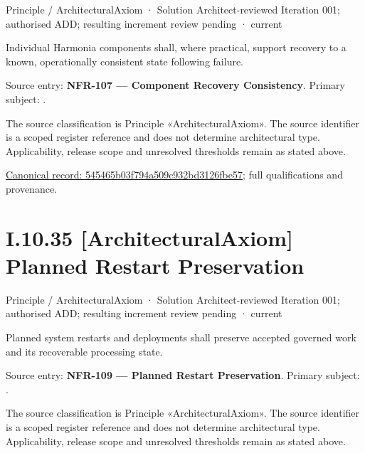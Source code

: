 \label{element:545465b03f794a509c932bd3126fbe57}
{\small Principle / ArchitecturalAxiom · Solution Architect-reviewed Iteration 001; authorised ADD; resulting increment review pending · current}\par

Individual Harmonia components shall, where practical, support recovery to a known, operationally consistent state following failure.



Source entry: \textbf{NFR-107 — Component Recovery Consistency}. Primary subject: \texttt{}.



The source classification is Principle «ArchitecturalAxiom». The source identifier is a scoped register reference and does not determine architectural type. Applicability, release scope and unresolved thresholds remain as stated above.


{\footnotesize \href{../../../../../../../continuum/motivation/principle/architectural-axiom/545465b03f794a509c932bd3126fbe57.md}{Canonical record: 545465b03f794a509c932bd3126fbe57}; full qualifications and provenance.}\par
\section*{I.10.35 [ArchitecturalAxiom] Planned Restart Preservation}
\label{navigation:I.10.35}

\label{element:0ce24ee595a445e5b1a95e54aa9f1eac}
{\small Principle / ArchitecturalAxiom · Solution Architect-reviewed Iteration 001; authorised ADD; resulting increment review pending · current}\par

Planned system restarts and deployments shall preserve accepted governed work and its recoverable processing state.



Source entry: \textbf{NFR-109 — Planned Restart Preservation}. Primary subject: \texttt{}.



The source classification is Principle «ArchitecturalAxiom». The source identifier is a scoped register reference and does not determine architectural type. Applicability, release scope and unresolved thresholds remain as stated above.


